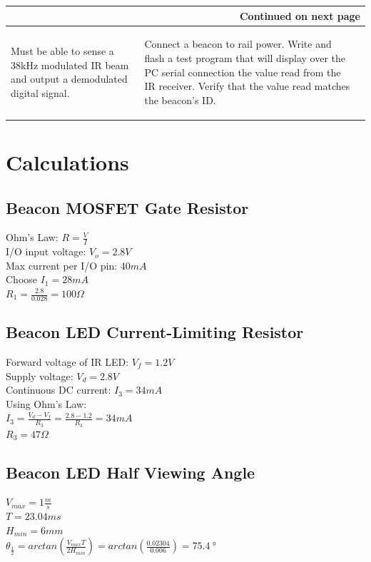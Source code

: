 \documentclass[openbib,letterpaper,10pt]{article}
\begin{document}
\begin{spacing}{1.15}
\begin{appendix}
\begin{singlespacing}
\begin{center}
\begin{longtable}{|p{18em}|p{18em}|p{5em}|}
		\hline \multicolumn{3}{|r|}{{Continued on next page}} \\ \hline
		\endfoot
		\endlastfoot
			\begin{compactenum}
				\item Must be able to sense a 38kHz modulated IR beam and output a demodulated digital signal.
			\end{compactenum}
			&
			\begin{compactenum}
				\item Connect a beacon to rail power. Write and flash a test program that will display over the PC serial connection the value read from the IR receiver. Verify that the value read matches the beacon's ID.
			\end{compactenum}
			& \\ \hline

	\end{longtable}
\end{center}
\end{singlespacing}

\clearpage

\section{Calculations}

\subsection{Beacon MOSFET Gate Resistor}
Ohm's Law: $R=\frac{V}{I}$ \\
I/O input voltage: $V_o=2.8V$ \\
Max current per I/O pin: $40mA$ \\
Choose $I_1=28mA$ \\
$R_1=\frac{2.8}{0.028}=100\Omega$

\subsection{Beacon LED Current-Limiting Resistor}
Forward voltage of IR LED: $V_f=1.2V$ \\
Supply voltage: $V_d=2.8V$ \\
Continuous DC current: $I_3=34mA$ \\
Using Ohm's Law: \\
$I_3=\frac{V_d-V_f}{R_3}=\frac{2.8-1.2}{R_3}=34mA$ \\
$R_3=47\Omega$

\subsection{Beacon LED Half Viewing Angle}
$V_{max}=1\frac{m}{s}$ \\
$T=23.04ms$ \\
$H_{min}= 6mm$ \\
$\theta_{\frac{1}{2}}=arctan(\frac{V_{max}T}{2H_{min}})=arctan(\frac{0.02304}{0.006})=\SI{75.4}{\degree}$


\end{appendix}
\end{spacing}
\end{document}

